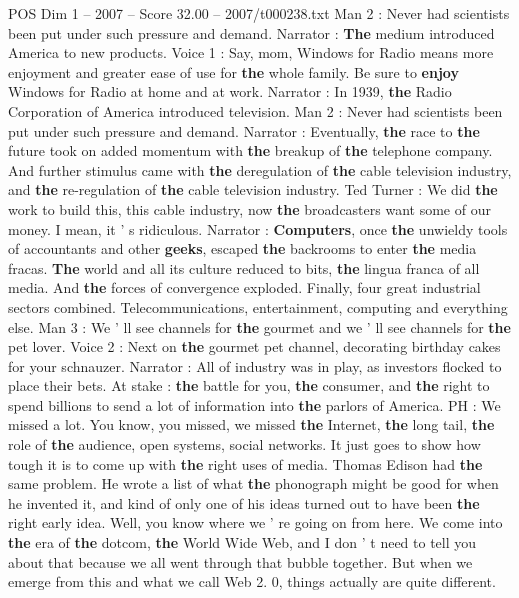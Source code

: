 \begin{textsample}{POS Dim 1 – 2007 – Score 32.00 – 2007/t000238.txt}
Man 2 : Never had scientists been put under such pressure and demand.
Narrator : \textbf{The} medium introduced America to new products.
Voice 1 : Say, mom, Windows for Radio means more enjoyment and greater ease of use for \textbf{the} whole family.
Be sure to \textbf{enjoy} Windows for Radio at home and at work.
Narrator : In 1939, \textbf{the} Radio Corporation of America introduced television.
Man 2 : Never had scientists been put under such pressure and demand.
Narrator : Eventually, \textbf{the} race to \textbf{the} future took on added momentum with \textbf{the} breakup of \textbf{the} telephone company.
And further stimulus came with \textbf{the} deregulation of \textbf{the} cable television industry, and \textbf{the} re-regulation of \textbf{the} cable television industry.
Ted Turner : We did \textbf{the} work to build this, this cable industry, now \textbf{the} broadcasters want some of our money.
I mean, it ' s ridiculous.
Narrator : \textbf{Computers}, once \textbf{the} unwieldy tools of accountants and other \textbf{geeks}, escaped \textbf{the} backrooms to enter \textbf{the} media fracas. \textbf{The} world and all its culture reduced to bits, \textbf{the} lingua franca of all media.
And \textbf{the} forces of convergence exploded.
Finally, four great industrial sectors combined.
Telecommunications, entertainment, computing and everything else.
Man 3 : We ' ll see channels for \textbf{the} gourmet and we ' ll see channels for \textbf{the} pet lover.
Voice 2 : Next on \textbf{the} gourmet pet channel, decorating birthday cakes for your schnauzer.
Narrator : All of industry was in play, as investors flocked to place their bets.
At stake : \textbf{the} battle for you, \textbf{the} consumer, and \textbf{the} right to spend billions to send a lot of information into \textbf{the} parlors of America.
PH : We missed a lot.
You know, you missed, we missed \textbf{the} Internet, \textbf{the} long tail, \textbf{the} role of \textbf{the} audience, open systems, social networks.
It just goes to show how tough it is to come up with \textbf{the} right uses of media.
Thomas Edison had \textbf{the} same problem.
He wrote a list of what \textbf{the} phonograph might be good for when he invented it, and kind of only one of his ideas turned out to have been \textbf{the} right early idea.
Well, you know where we ' re going on from here.
We come into \textbf{the} era of \textbf{the} dotcom, \textbf{the} World Wide Web, and I don ' t need to tell you about that because we all went through that bubble together.
But when we emerge from this and what we call Web 2. 0, things actually are quite different.

\end{textsample}
